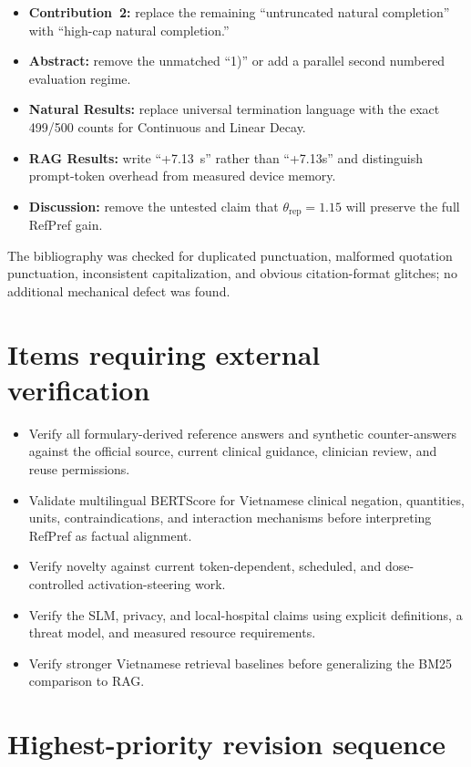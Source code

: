 \documentclass[11pt]{article}
\begin{document}
\begin{itemize}
    \item \textbf{Contribution~2:} replace the remaining ``untruncated natural completion'' with ``high-cap natural completion.''
    \item \textbf{Abstract:} remove the unmatched ``1)'' or add a parallel second numbered evaluation regime.
    \item \textbf{Natural Results:} replace universal termination language with the exact 499/500 counts for Continuous and Linear Decay.
    \item \textbf{RAG Results:} write ``+7.13~s'' rather than ``+7.13s'' and distinguish prompt-token overhead from measured device memory.
    \item \textbf{Discussion:} remove the untested claim that $\theta_{\text{rep}}=1.15$ will preserve the full RefPref gain.
\end{itemize}

The bibliography was checked for duplicated punctuation, malformed quotation punctuation, inconsistent capitalization, and obvious citation-format glitches; no additional mechanical defect was found.

\section*{Items requiring external verification}

\begin{itemize}
    \item Verify all formulary-derived reference answers and synthetic counter-answers against the official source, current clinical guidance, clinician review, and reuse permissions.
    \item Validate multilingual BERTScore for Vietnamese clinical negation, quantities, units, contraindications, and interaction mechanisms before interpreting RefPref as factual alignment.
    \item Verify novelty against current token-dependent, scheduled, and dose-controlled activation-steering work.
    \item Verify the SLM, privacy, and local-hospital claims using explicit definitions, a threat model, and measured resource requirements.
    \item Verify stronger Vietnamese retrieval baselines before generalizing the BM25 comparison to RAG.
\end{itemize}

\section*{Highest-priority revision sequence}
\end{document}
